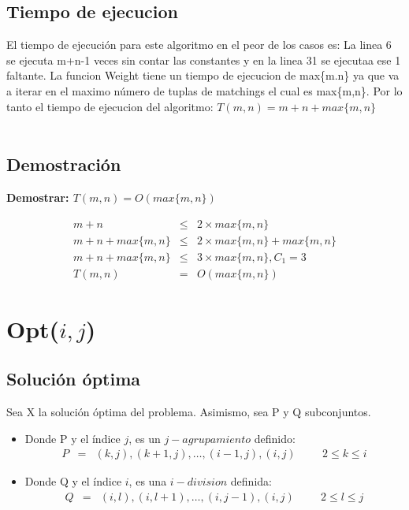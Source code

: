 \documentclass{article}
\begin{document}
\subsection{Tiempo de ejecucion}
El tiempo de ejecución para este algoritmo en el peor de los casos es: 
    La linea 6 se ejecuta m+n-1 veces sin contar las constantes y en la linea 31 se ejecutaa ese 1 faltante. La funcion Weight tiene un tiempo de ejecucion de max\{m.n\} ya que va a iterar en el maximo número de tuplas de matchings el cual es max\{m,n\}. 
    Por lo tanto el tiempo de ejecucion del algoritmo: $T(m,n) = m+n+max\{m,n\}$ \\ \\
\subsection{Demostración}
\textbf{Demostrar: $T(m,n) = O(max\{m,n\})$}

\begin{eqnarray*}
m+n & \leq & 2 \times max\{m,n\} \\
m+n+ max\{m,n\}  & \leq & 2 \times max\{m,n\} + max\{m,n\} \\
m+n+ max\{m,n\}  & \leq & 3 \times max\{m,n\}, C_1 = 3 \\
T(m,n)& =&  O(max\{m,n\}) 
\end{eqnarray*}
\section{Opt($i,j$)}
\subsection{Solución óptima}
Sea X la solución óptima del problema. Asimismo, sea P y Q subconjuntos.
\begin{itemize}
\item Donde P y el índice $j$, es un $j-agrupamiento$ definido:
\begin{eqnarray*}
P &=& (k,j),(k+1,j), \dots ,(i-1,j),(i,j) \hspace{1cm} 2 \leq k \leq i
\end{eqnarray*}
\item Donde Q y el índice $i$, es una $i-division$ definida:
\begin{eqnarray*}
Q &=& (i,l),(i,l+1), \dots ,(i,j-1),(i,j) \hspace{1cm} 2 \leq l \leq j
\end{eqnarray*}
\end{itemize}
\end{document}
